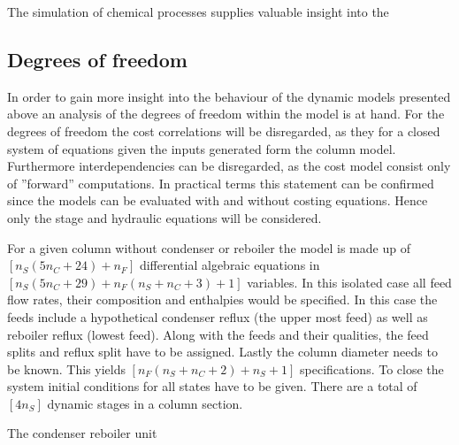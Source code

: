 The simulation of chemical processes supplies valuable insight into the

    \subsection{Degrees of freedom}
    In order to gain more insight into the behaviour of the dynamic models presented above an analysis
    of the degrees of freedom within the model is at hand. For the degrees of freedom the cost correlations
    will be disregarded, as they for a closed system of equations given the inputs generated form the column
    model. Furthermore interdependencies can be disregarded, as the cost model consist only of ''forward''
    computations. In practical terms this statement can be confirmed since the models can be evaluated
    with and without costing equations. Hence only the stage and hydraulic equations will be considered.

    For a given column without condenser or reboiler the model is made up of $[n_S (5n_C + 24) + n_F]$
    differential algebraic equations in $[n_S (5n_C + 29) + n_F (n_S + n_C + 3) + 1]$ variables. In this
    isolated case all feed flow rates, their composition and enthalpies would be specified. In this case
    the feeds include a hypothetical condenser reflux (the upper most feed) as well as reboiler reflux
    (lowest feed). Along with the feeds and their qualities, the feed splits and reflux split have to be
    assigned. Lastly the column diameter needs to be known. This yields $[n_F (n_S + n_C + 2) + n_S + 1]$
    specifications. To close the system initial conditions for all states have to be given. There
    are a total of $[4 n_S ]$ dynamic stages in a column section.

    The condenser reboiler unit

